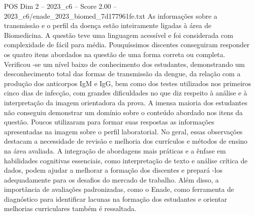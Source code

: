 \begin{textsample}{POS Dim 2 – 2023\_c6 – Score 2.00 – 2023\_c6/enade\_2023\_biomed\_7d177961fe.txt}
As informações sobre a transmissão e o perfil da doença estão inteiramente ligadas à área de Biomedicina.
A questão teve uma linguagem acessível e foi considerada com complexidade de fácil para média.
Pouquíssimos discentes conseguiram responder os quatro itens abordados na questão de uma forma correta ou completa.
Verificou -se um nível baixo de conhecimento dos estudantes, demonstrando um desconhecimento total das formas de transmissão da dengue, da relação com a produção dos anticorpos IgM e IgG, bem como dos testes utilizados nos primeiros cinco dias de infecção, com grandes dificuldades no que diz respeito à análise e à interpretação da imagem orientadora da prova.
A imensa maioria dos estudantes não conseguiu demonstrar um domínio sobre o conteúdo abordado nos itens da questão.
Poucos utilizaram para formar suas respostas as informações apresentadas na imagem sobre o perfil laboratorial.
No geral, essas observações destacam a necessidade de revisão e melhoria dos currículos e métodos de ensino na área avaliada.
A integração de abordagens mais práticas e a ênfase em habilidades cognitivas essenciais, como interpretação de texto e análise crítica de dados, podem ajudar a melhorar a formação dos discentes e prepará -los adequadamente para os desafios do mercado de trabalho.
Além disso, a importância de avaliações padronizadas, como o Enade, como ferramenta de diagnóstico para identificar lacunas na formação dos estudantes e orientar melhorias curriculares também é ressaltada.

\end{textsample}
